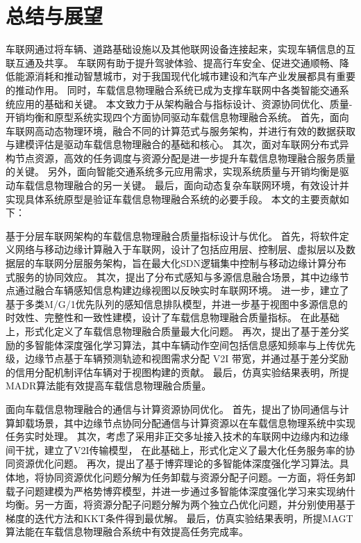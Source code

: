 \chapter{总结与展望}\label{section 6}
\removelofgap
\removelotgap
车联网通过将车辆、道路基础设施以及其他联网设备连接起来，实现车辆信息的互联互通及共享。
车联网有助于提升驾驶体验、提高行车安全、促进交通顺畅、降低能源消耗和推动智慧城市，对于我国现代化城市建设和汽车产业发展都具有重要的推动作用。
同时，车载信息物理融合系统已成为支撑车联网中各类智能交通系统应用的基础和关键。
本文致力于从架构融合与指标设计、资源协同优化、质量-开销均衡和原型系统实现四个方面协同驱动车载信息物理融合系统。
首先，面向车联网高动态物理环境，融合不同的计算范式与服务架构，并进行有效的数据获取与建模评估是驱动车载信息物理融合的基础和核心。
其次，面对车联网分布式异构节点资源，高效的任务调度与资源分配是进一步提升车载信息物理融合服务质量的关键。
另外，面向智能交通系统多元应用需求，实现系统质量与开销均衡是驱动车载信息物理融合的另一关键。
最后，面向动态复杂车联网环境，有效设计并实现具体系统原型是验证车载信息物理融合系统的必要手段。
本文的主要贡献如下：

 基于分层车联网架构的车载信息物理融合质量指标设计与优化。
首先，将软件定义网络与移动边缘计算融入于车联网，设计了包括应用层、控制层、虚拟层以及数据层的车联网分层服务架构，旨在最大化SDN逻辑集中控制与移动边缘计算分布式服务的协同效应。
其次，提出了分布式感知与多源信息融合场景，其中边缘节点通过融合车辆感知信息构建边缘视图以反映实时车联网环境。
进一步，建立了基于多类M/G/1优先队列的感知信息排队模型，并进一步基于视图中多源信息的时效性、完整性和一致性建模，设计了车载信息物理融合质量指标。
在此基础上，形式化定义了车载信息物理融合质量最大化问题。
再次，提出了基于差分奖励的多智能体深度强化学习算法，其中车辆动作空间包括信息感知频率与上传优先级，边缘节点基于车辆预测轨迹和视图需求分配 V2I 带宽，并通过基于差分奖励的信用分配机制评估车辆对于视图构建的贡献。
最后，仿真实验结果表明，所提MADR算法能有效提高车载信息物理融合质量。

 面向车载信息物理融合的通信与计算资源协同优化。
首先，提出了协同通信与计算卸载场景，其中边缘节点协同分配通信与计算资源以在车载信息物理系统中实现任务实时处理。
其次，考虑了采用非正交多址接入技术的车联网中边缘内和边缘间干扰，建立了V2I传输模型，
在此基础上，形式化定义了最大化任务服务率的协同资源优化问题。
再次，提出了基于博弈理论的多智能体深度强化学习算法。具体地，将协同资源优化问题分解为任务卸载与资源分配子问题。一方面，将任务卸载子问题建模为严格势博弈模型，并进一步通过多智能体深度强化学习来实现纳什均衡。另一方面，将资源分配子问题分解为两个独立凸优化问题，并分别使用基于梯度的迭代方法和KKT条件得到最优解。
最后，仿真实验结果表明，所提MAGT算法能在车载信息物理融合系统中有效提高任务完成率。

